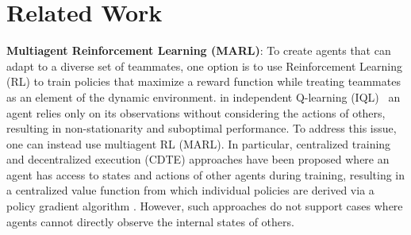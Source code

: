 \section{Related Work}
%
\label{Sec:Related}



\textbf{Multiagent Reinforcement Learning (MARL)}: To create agents that can adapt to a diverse set of teammates, one option is to use Reinforcement Learning (RL) to train policies that maximize a reward function while treating teammates as an element of the dynamic environment. \Eg in independent Q-learning (IQL)~\citep{lee2022investigation} an agent relies only on its observations without considering the actions of others, resulting in non-stationarity and suboptimal performance. To address this issue, one can instead use multiagent RL (MARL). In particular, centralized training and decentralized execution (CDTE) approaches have been proposed \cite {lowe2017maac} where an agent has access to states and actions of other agents during training, resulting in a centralized value function from which individual policies are derived via a policy gradient algorithm \citep{sutton1999functionapprox}. However, such approaches do not support cases where agents cannot directly observe the internal states of others. 

